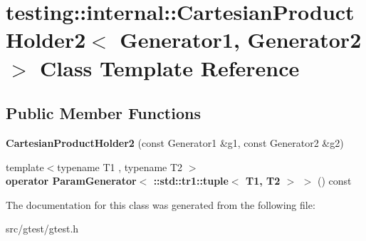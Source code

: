 \hypertarget{classtesting_1_1internal_1_1_cartesian_product_holder2}{}\section{testing\+:\+:internal\+:\+:Cartesian\+Product\+Holder2$<$ Generator1, Generator2 $>$ Class Template Reference}
\label{classtesting_1_1internal_1_1_cartesian_product_holder2}
\subsection*{Public Member Functions}
\begin{DoxyCompactItemize}
\item 
\mbox{\label{classtesting_1_1internal_1_1_cartesian_product_holder2_a504471500c3171f7efee84b830004ff9}} 
{\bfseries Cartesian\+Product\+Holder2} (const Generator1 \&g1, const Generator2 \&g2)
\item 
\mbox{\label{classtesting_1_1internal_1_1_cartesian_product_holder2_aec54bc7ce7c58a9542bcb6ef42419c43}} 
{\footnotesize template$<$typename T1 , typename T2 $>$ }\\{\bfseries operator Param\+Generator$<$ \+::std\+::tr1\+::tuple$<$ T1, T2 $>$ $>$} () const
\end{DoxyCompactItemize}


The documentation for this class was generated from the following file\+:\begin{DoxyCompactItemize}
\item 
src/gtest/gtest.\+h\end{DoxyCompactItemize}
